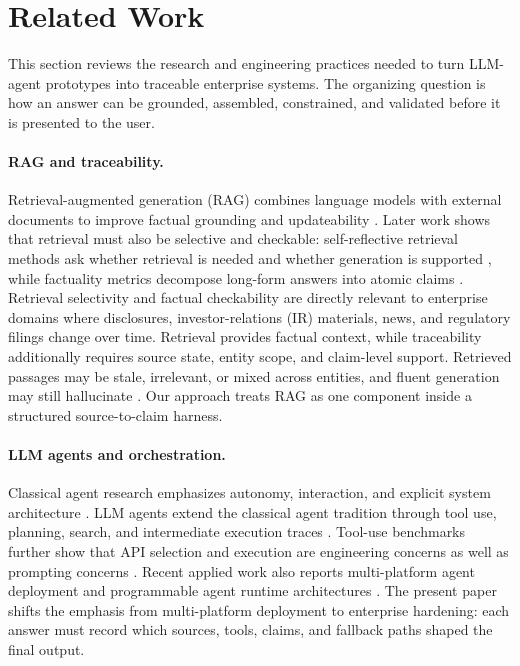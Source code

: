 \section{Related Work}

This section reviews the research and engineering practices needed to turn LLM-agent prototypes into traceable enterprise systems. The organizing question is how an answer can be grounded, assembled, constrained, and validated before it is presented to the user.

\paragraph{RAG and traceability.}
Retrieval-augmented generation (RAG) combines language models with external documents to improve factual grounding and updateability \citep{lewis2020rag,gao2023rag}. Later work shows that retrieval must also be selective and checkable: self-reflective retrieval methods ask whether retrieval is needed and whether generation is supported \citep{asai2024selfrag}, while factuality metrics decompose long-form answers into atomic claims \citep{min2023factscore}. Retrieval selectivity and factual checkability are directly relevant to enterprise domains where disclosures, investor-relations (IR) materials, news, and regulatory filings change over time. Retrieval provides factual context, while traceability additionally requires source state, entity scope, and claim-level support. Retrieved passages may be stale, irrelevant, or mixed across entities, and fluent generation may still hallucinate \citep{ji2023hallucination}. Our approach treats RAG as one component inside a structured source-to-claim harness.

\paragraph{LLM agents and orchestration.}
Classical agent research emphasizes autonomy, interaction, and explicit system architecture \citep{wooldridge1995intelligent,jennings1998roadmap}. LLM agents extend the classical agent tradition through tool use, planning, search, and intermediate execution traces \citep{yao2023react,schick2023toolformer,wang2024surveyagents,acharya2025agentic}. Tool-use benchmarks further show that API selection and execution are engineering concerns as well as prompting concerns \citep{qin2024toolllm}. Recent applied work also reports multi-platform agent deployment and programmable agent runtime architectures \citep{ahn2025autonomous,walters2025eliza}. The present paper shifts the emphasis from multi-platform deployment to enterprise hardening: each answer must record which sources, tools, claims, and fallback paths shaped the final output.

